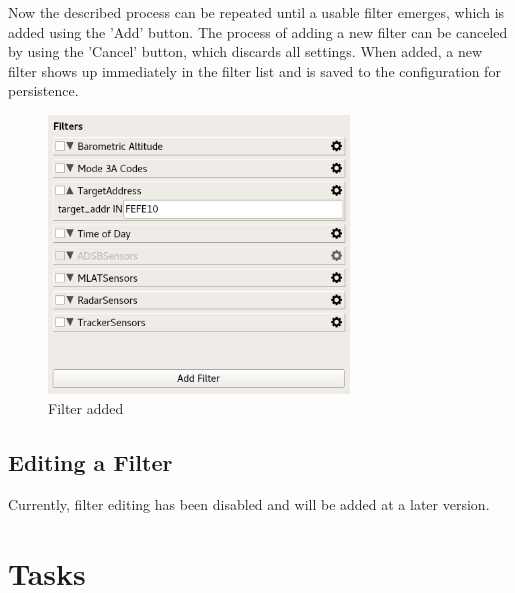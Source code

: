 \documentclass[10pt,letterpaper,extrafontsizes]{memoir}
\begin{document}
Now the described process can be repeated until a usable filter emerges, which is added using the 'Add'
button. The process of adding a new filter can be canceled by using the 'Cancel' button, which discards all
settings. When added, a new filter shows up immediately in the filter list and is saved to the configuration
for persistence.

\begin{figure}[H]
  \center
    \includegraphics[width=8cm,frame]{../screenshots/filter_add3.png}
  \caption{Filter added}
  \label{fig:filter_add3}
\end{figure}

\subsection{Editing a Filter}
\label{sec:filter_editing}

Currently, filter editing has been disabled and will be added at a later version.




\section{Tasks}
\label{sec:tasks}
\end{document}

